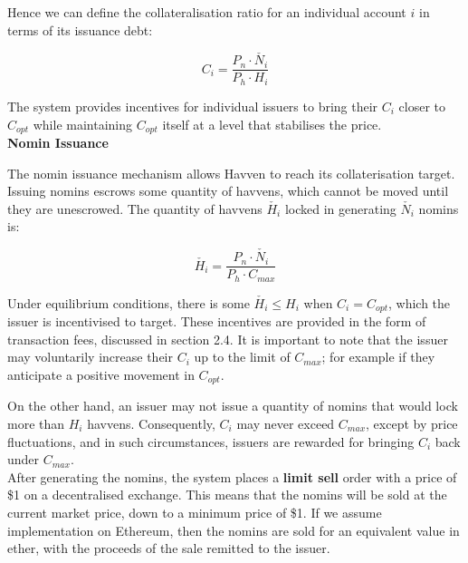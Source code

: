 \noindent Hence we can define the collateralisation ratio for an individual account $i$ in terms of its issuance debt:

\begin{equation}
C_i = \frac{P_n \cdot \check{N_i}}{P_h \cdot H_i}  \label{eq:individualcollateralisation}
\end{equation}

\vspace{3 mm}

\noindent The system provides incentives for individual issuers to bring their $C_i$ closer to $C_{opt}$ while maintaining $C_{opt}$ itself at a level that stabilises the price. \\

\noindent \textbf{Nomin Issuance}

\vspace{1mm}

\noindent The nomin issuance mechanism allows Havven to reach its collaterisation target.
Issuing nomins escrows some quantity of havvens, which cannot be moved until they are unescrowed.
The quantity of havvens $\check{H_i}$ locked in generating $\check{N_i}$ nomins is:

\begin{equation}
\check{H_i} = \frac{P_n \cdot \check{N_i}}{P_h \cdot C_{max}}  \label{eq:escrowed}
\end{equation}

\vspace{3 mm}

\noindent Under equilibrium conditions, there is some $\check{H_i} \leq H_i$ when $C_i = C_{opt}$, which the issuer is incentivised to target. These incentives are provided in the form of transaction fees, discussed in section 2.4. It is important to note that the issuer may voluntarily increase their $C_i$ up to the limit of $C_{max}$; for example if they anticipate a positive movement in $C_{opt}$. \\

\newpage

\noindent On the other hand, an issuer may not issue a quantity of nomins that would lock more than $H_i$ havvens.  Consequently, $C_i$ may never exceed $C_{max}$, except by price fluctuations, and in such circumstances, issuers are rewarded for bringing $C_i$ back under $C_{max}$. \\

\noindent After generating the nomins, the system places a \textbf{limit sell} order with a price of \$1 on a decentralised exchange. This means that the nomins will be sold at the current market price, down to a minimum price of \$1. If we assume implementation on Ethereum, then the nomins are sold for an equivalent value in ether, with the proceeds of the sale remitted to the issuer. \\

